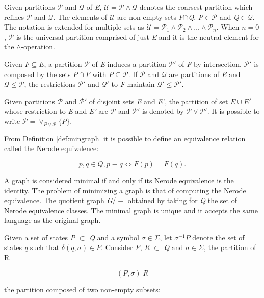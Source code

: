{Given partitions $\mathcal{P}$ and $\mathcal{Q}$ of \textit{E}, $\mathcal{U} = \mathcal{P}\wedge\mathcal{Q}$ denotes the coarsest partition which refines $\mathcal{P}$ and $\mathcal{Q}$. The elements of $\mathcal{U}$ are non-empty sets \textit{P}$\cap$\textit{Q}, \textit{P}$\in\mathcal{P}$ and \textit{Q}$\in\mathcal{Q}$. The notation is extended for multiple sets as $\mathcal{U} = \mathcal{P}_1 \wedge \mathcal{P}_2 \wedge \ldots \wedge \mathcal{P}_n$. When $n=0$,  $\mathcal{P}$ is the universal partition comprised of just \textit{E} and it is the neutral element for the $\wedge$-operation.

Given $F\subseteq E$, a partition $\mathcal{P}$ of \textit{E} induces a partition $\mathcal{P}'$  
of \textit{F} by intersection. $\mathcal{P}'$ is composed by the sets $P\cap F$ with $P\subseteq \mathcal{P}$. If $\mathcal{P}$ and $\mathcal{Q}$ are partitions of \textit{E} and $\mathcal{Q} \leq \mathcal{P}$, the restrictions $\mathcal{P}'$ and $\mathcal{Q}'$ to \textit{F} maintain $\mathcal{Q}' \leq \mathcal{P}'$.

Given partitions $\mathcal{P}$ and $\mathcal{P}'$ of disjoint sets \textit{E} and \textit{E'}, the partition of set $E \cup E'$ whose restriction to \textit{E} and \textit{E'} are $\mathcal{P}$ and $\mathcal{P'}$ is denoted by $\mathcal{P}\vee\mathcal{P}'$. It is possible to write $\mathcal{P} = \vee_{P\vee\mathcal{P}}\{P\}$.

From Definition \ref{def:mingraph} it is possible to define an equivalence relation called the Nerode equivalence:

\[
p, q \in Q, p \equiv q \Leftrightarrow F(p) = F(q).
\]

A graph is considered minimal if and only if its Nerode equivalence is the identity. The problem of minimizing a graph is that of computing the Nerode equivalence. The quotient graph \textit{G}/$\equiv$ obtained by taking for \textit{Q} the set of Nerode equivalence classes. The minimal graph is unique and it accepts the same language as the original graph.

Given a set of states \textit{P} $\subset$  \textit{Q} and a symbol $\sigma \in \Sigma$, let $\sigma^{-1}\textit{P}$ denote the set of states \textit{q} such that $\delta(q, \sigma) \in P$. Consider \textit{P}, \textit{R} $\subset$ \textit{Q} and $\sigma \in \Sigma$, the partition of R

\[
(P, \sigma)|R
\]

\noindent the partition composed of two non-empty subsets:

}
